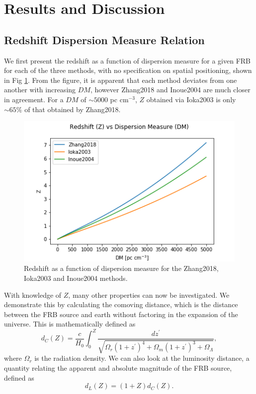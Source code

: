 \documentclass{article}
\begin{document}
\section{Results and Discussion}

\subsection{Redshift Dispersion Measure Relation}

We first present the redshift as a function of dispersion measure for a given FRB for each of the three methods, with no specification on spatial positioning, shown in Fig \ref{fig:ZvDM}. From the figure, it is apparent that each method deviates from one another with increasing $DM$, however Zhang2018 and Inoue2004 are much closer in agreement. For a $DM$ of $\sim5000$ pc cm$^{-3}$, $Z$ obtained via Ioka2003 is only $\sim65\%$ of that obtained by Zhang2018.  

\begin{figure}[!htb]
\includegraphics[width=\linewidth]{Z_vs_DM.png}
\caption{Redshift as a function of dispersion measure for the Zhang2018, Ioka2003 and Inoue2004 methods.}
\label{fig:ZvDM}
\end{figure}

With knowledge of $Z$, many other properties can now be investigated. We demonstrate this by calculating the comoving distance, which is the distance between the FRB source and earth without factoring in the expansion of the universe. This is mathematically defined as
\begin{equation}
d_C(Z)=\frac{c}{H_0} \int_0^Z \frac{dz^\prime}{ \sqrt{\Omega_r (1+z^\prime)^4 +\Omega_m (1+z^\prime)^3 + \Omega_\Lambda}  },
\end{equation} 
where $\Omega_r$ is the radiation density. We can also look at the luminosity distance, a quantity relating the apparent and absolute magnitude of the FRB source, defined as
\begin{equation}
d_L(Z)=(1+Z)d_C(Z).
\end{equation}
\end{document}
